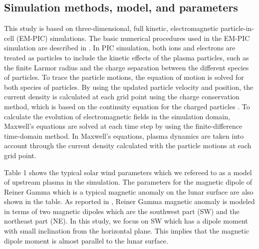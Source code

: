 \documentclass[draft,jgrga]{agutex2015}
\begin{document}
\begin{article}
\section{Simulation methods, model, and parameters}
This study is based on three-dimensional, full kinetic,
electromagnetic particle-in-cell (EM-PIC) simulations.
The basic numerical procedures used in the EM-PIC simulation are 
described in \cite{Birdsall1991}.  
In PIC simulation, 
both ions and electrons are treated as particles to 
include the kinetic effects of the plasma particles, 
such as the finite Larmor radius and the charge separation 
between the different species of particles. 
To trace the particle motions, 
the equation of motion is solved for both species of particles.
By using the updated particle velocity and position, 
the current density is calculated at each grid point using the charge conservation method, 
which is based on the continuity equation for the charged particles \cite{Villasenor1992}.
To calculate the evolution of electromagnetic fields in the simulation domain,
Maxwell's equations are solved at each time step
by using the finite-difference time-domain method.
In Maxwell's equations, plasma dynamics are taken into account through
the current density calculated with the particle motions at each grid point.

Table 1 shows the typical solar wind parameters
which we refereed to as a model of upstream plasma in the simulation.
The parameters for the magnetic dipole of Reiner Gamma
which is a typical magnetic anomaly on the lunar surface
are also shown in the table. 
As reported in \cite{kurata2005}, 
Reiner Gamma magnetic anomaly is modeled in terms of two magnetic dipoles
which are the southwest part (SW) and the northeast part (NE).
In this study, 
we focus on SW which has a dipole moment with
small inclination from the horizontal plane.
This implies that 
the magnetic dipole moment is almost parallel to the lunar surface. 




\end{article}
\end{document}
